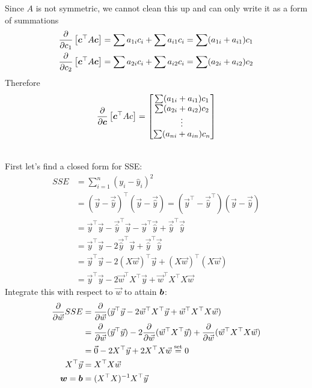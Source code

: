 \documentclass[12pt]{article}
\begin{document}
\begin{enumerate}
Since $A$ is not symmetric, we cannot clean this up and can only write it as a form of summations $$ \begin{aligned} \dfrac{\partial}{\partial c_1}\left[\boldsymbol{c}^\top A\boldsymbol{c}\right] &= \sum a_{1i}c_i + \sum a_{i1}c_i = \sum (a_{1i} + a_{i1})c_1\\ \dfrac{\partial}{\partial c_2}\left[\boldsymbol{c}^\top A\boldsymbol{c}\right] &= \sum a_{2i}c_i + \sum a_{i2}c_i = \sum (a_{2i} + a_{i2})c_2 \end{aligned} $$ 
Therefore $$ \dfrac{\partial}{\partial \boldsymbol{c}}\left[\boldsymbol{c}^\top Ac\right] = \begin{bmatrix} \sum (a_{1i} + a_{i1})c_1 \\ \sum (a_{2i} + a_{i2})c_2 \\ \vdots \\ \sum (a_{ni} + a_{in})c_n \end{bmatrix} $$ 

\newpage
{} \\
First let's find a closed form for SSE: $$ \begin{aligned} 
SSE &= \sum_{i=1}^n (y_i - \hat{y}_i)^2 \\ &= (\vec{y} - \vec{\hat{y}})^\top(\vec{y} - \vec{\hat{y}}) = (\vec{y}^\top - \vec{\hat{y}}^\top)(\vec{y} - \vec{\hat{y}}) \\ &= \vec{y}^\top\vec{y} - \vec{\hat{y}}^\top\vec{y} - \vec{y}^\top\vec{\hat{y}} + \vec{\hat{y}}^\top\vec{\hat{y}} \\ &= \vec{y}^\top\vec{y} - 2\vec{\hat{y}}^\top\vec{y} + \vec{\hat{y}}^\top\vec{\hat{y}} \\ &= \vec{y}^\top\vec{y} - 2(X\vec{w})^\top\vec{y} + (X\vec{w})^\top(X\vec{w}) \\ &= \vec{y}^\top\vec{y} - 2\vec{w}^\top X^\top\vec{y} + \vec{w}^\top X^\top X\vec{w} \end{aligned} $$ 
Integrate this with respect to $\vec{w}$ to attain $\boldsymbol{b}$: $$ \begin{aligned} \frac{\partial}{\partial \vec{w}} SSE &= \frac{\partial}{\partial \vec{w}} (\vec{y}^\top \vec{y} - 2\vec{w}^\top X^\top\vec{y} + \vec{w}^\top X^\top X\vec{w}) \\ &= \frac{\partial}{\partial \vec{w}} (\vec{y}^\top\vec{y}) - 2\frac{\partial}{\partial \vec{w}} (\vec{w}^\top X^\top\vec{y}) + \frac{\partial}{\partial \vec{w}} (\vec{w}^\top X^\top X\vec{w}) \\ &= \vec{0} - 2X^\top\vec{y} + 2X^\top X\vec{w} \stackrel{\text{set}}{=} 0 \\ X^\top\vec{y} &= X^\top X\vec{w} \\ \boldsymbol{w} = \boldsymbol{b} &= (X^\top X)^{-1}X^\top\vec{y} \end{aligned} $$ 


\end{enumerate}
\end{document}
